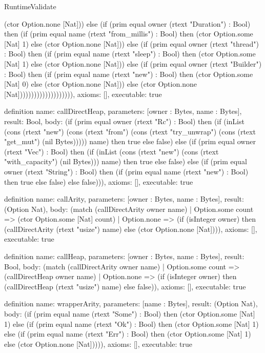\begin{lexlean}{RuntimeValidate}
\begin{semanticmodule}
{(ctor Option.none [Nat])) else (if (prim equal owner (rtext "Duration") : Bool) then (if (prim equal name (rtext "from_millis") : Bool) then (ctor Option.some [Nat] 1) else (ctor Option.none [Nat])) else (if (prim equal owner (rtext "thread") : Bool) then (if (prim equal name (rtext "sleep") : Bool) then (ctor Option.some [Nat] 1) else (ctor Option.none [Nat])) else (if (prim equal owner (rtext "Builder") : Bool) then (if (prim equal name (rtext "new") : Bool) then (ctor Option.some [Nat] 0) else (ctor Option.none [Nat])) else (ctor Option.none [Nat]))))))))))))))))))),
  axioms: [],
  executable: true
}

definition{
  name: callDirectHeap,
  parameters: [owner : Bytes, name : Bytes],
  result: Bool,
  body: (if (prim equal owner (rtext "Rc") : Bool) then (if (inList (cons (rtext "new") (cons (rtext "from") (cons (rtext "try_unwrap") (cons (rtext "get_mut") (nil Bytes))))) name) then true else false) else (if (prim equal owner (rtext "Vec") : Bool) then (if (inList (cons (rtext "new") (cons (rtext "with_capacity") (nil Bytes))) name) then true else false) else (if (prim equal owner (rtext "String") : Bool) then (if (prim equal name (rtext "new") : Bool) then true else false) else false))),
  axioms: [],
  executable: true
}

definition{
  name: callArity,
  parameters: [owner : Bytes, name : Bytes],
  result: (Option Nat),
  body: (match (callDirectArity owner name)
    | Option.some count => (ctor Option.some [Nat] count)
    | Option.none => (if (isInteger owner) then (callDirectArity (rtext "usize") name) else (ctor Option.none [Nat]))),
  axioms: [],
  executable: true
}

definition{
  name: callHeap,
  parameters: [owner : Bytes, name : Bytes],
  result: Bool,
  body: (match (callDirectArity owner name)
    | Option.some count => (callDirectHeap owner name)
    | Option.none => (if (isInteger owner) then (callDirectHeap (rtext "usize") name) else false)),
  axioms: [],
  executable: true
}

definition{
  name: wrapperArity,
  parameters: [name : Bytes],
  result: (Option Nat),
  body: (if (prim equal name (rtext "Some") : Bool) then (ctor Option.some [Nat] 1) else (if (prim equal name (rtext "Ok") : Bool) then (ctor Option.some [Nat] 1) else (if (prim equal name (rtext "Err") : Bool) then (ctor Option.some [Nat] 1) else (ctor Option.none [Nat])))),
  axioms: [],
  executable: true
}


\end{semanticmodule}
\end{lexlean}
